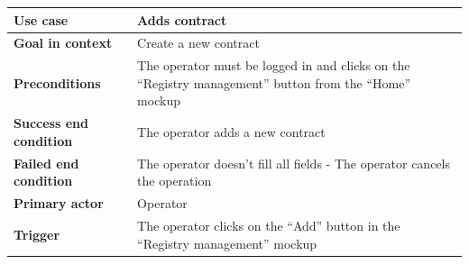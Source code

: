 {{{			\begin{center}
			\begin{tabular}{|p{4cm}|p{10cm}|}
			\hline
				\centering \vspace{1mm} \bfseries{Use case} \vspace{1mm} & 
				\vspace{1mm} Adds contract \vspace{1mm}\\
			\hline
				\centering \vspace{1mm} \bfseries{Goal in context} \vspace{1mm} & 
				\vspace{1mm} Create a new contract \vspace{1mm}\\
			\hline
				\centering \vspace{1mm} \bfseries{Preconditions} \vspace{1mm} & 
				\vspace{1mm} The operator must be logged in and clicks on the “Registry management” button from the “Home” mockup \vspace{1mm}\\
			\hline
				\centering \vspace{1mm} \bfseries{Success end condition} \vspace{1mm} & 
				\vspace{1mm} The operator adds a new contract \vspace{1mm}\\
			\hline
				\centering \vspace{1mm} \bfseries{Failed end condition} \vspace{1mm} & 
				\vspace{1mm} The operator doesn’t fill all fields - The operator cancels the operation \vspace{1mm}\\
			\hline
				\centering \vspace{1mm} \bfseries{Primary actor} \vspace{1mm} & 
				\vspace{1mm} Operator \vspace{1mm}\\
			\hline
				\centering \vspace{1mm} \bfseries{Trigger} \vspace{1mm} & 
				\vspace{1mm} The operator clicks on the “Add” button in the “Registry management” mockup \vspace{1mm}\\
			\hline
			\end{tabular}


\end{center}}}}
